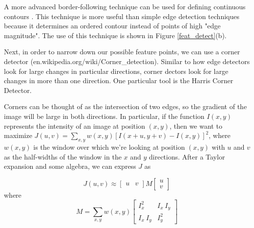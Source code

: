 \documentclass[paper=a4, fontsize=11pt]{scrartcl} %
\begin{document}
A more advanced border-following technique can be used for defining continuous contours \cite{Suzuki1985}. This technique is more useful than simple edge detection techniques because it determines an ordered contour instead of points of high "edge magnitude". The use of this technique is shown in Figure \ref{feat_detect}(b).



Next, in order to narrow down our possible feature points, we can use a corner detector (en.wikipedia.org/wiki/Corner\_detection). Similar to how edge detectors look for large changes in particular directions, corner dectors look for large changes in more than one direction. One particular tool is the Harris Corner Detector.

Corners can be thought of as the intersection of two edges, so the gradient of the image will be large in both directions. In particular, if the function $I(x, y)$ represents the intensity of an image at position $(x, y)$, then we want to maximize $J(u, v) = \sum_{x,y} w(x, y) [I(x+u, y+v) - I(x, y)]^2$, where $w(x, y)$ is the window over which we’re looking at position $(x, y)$ with $u$ and $v$ as the half-widths of the window in the $x$ and $y$ directions. After a Taylor expansion and some algebra, we can express $J$ as 

$$
J(u, v) \approx \begin{bmatrix}
u & v
\end{bmatrix} M \begin{bmatrix}
u\\
v
\end{bmatrix}
$$
where
$$
M = \sum_{x,y} w(x, y) \begin{bmatrix}
I_x^2 & I_x~I_y \\ I_x~I_y & I_y^2
\end{bmatrix}
$$
\end{document}
